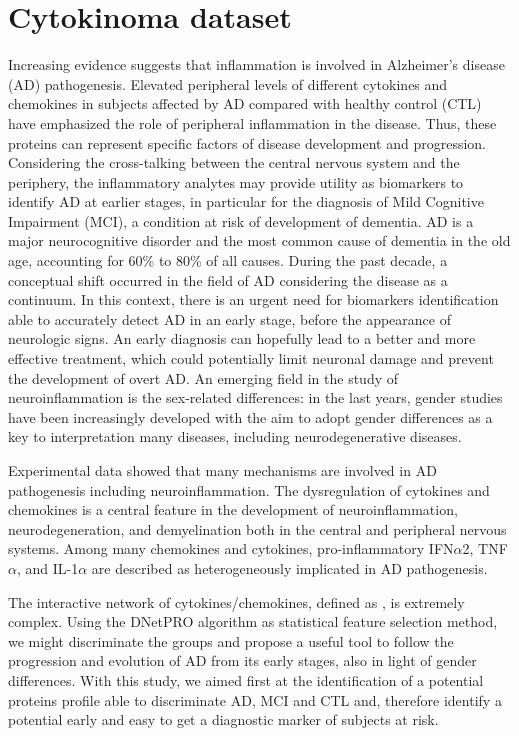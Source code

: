 \documentclass{standalone}
\begin{document}
\section[Cytokinoma Dataset]{Cytokinoma dataset}\label{cytokine}

Increasing evidence suggests that inflammation is involved in Alzheimer's disease (AD) pathogenesis.
Elevated peripheral levels of different cytokines and chemokines in subjects affected by AD compared with healthy control (CTL) have emphasized the role of peripheral inflammation in the disease.
Thus, these proteins can represent specific factors of disease development and progression.
Considering the cross-talking between the central nervous system and the periphery, the inflammatory analytes may provide utility as biomarkers to identify AD at earlier stages, in particular for the diagnosis of Mild Cognitive Impairment (MCI), a condition at risk of development of dementia.
AD is a major neurocognitive disorder and the most common cause of dementia in the old age, accounting for 60\% to 80\% of all causes.
During the past decade, a conceptual shift occurred in the field of AD considering the disease as a continuum.
In this context, there is an urgent need for biomarkers identification able to accurately detect AD in an early stage, before the appearance of neurologic signs.
An early diagnosis can hopefully lead to a better and more effective treatment, which could potentially limit neuronal damage and prevent the development of overt AD.
An emerging field in the study of neuroinflammation is the sex-related differences: in the last years, gender studies have been increasingly developed with the aim to adopt gender differences as a key to interpretation many diseases, including neurodegenerative diseases.

Experimental data showed that many mechanisms are involved in AD pathogenesis including neuroinflammation.
The dysregulation of cytokines and chemokines is a central feature in the development of neuroinflammation, neurodegeneration, and demyelination both in the central and peripheral nervous systems.
Among many chemokines and cytokines, pro-inflammatory IFN$\alpha$2, TNF$\alpha$, and IL-1$\alpha$ are described as heterogeneously implicated in AD pathogenesis.

The interactive network of cytokines/chemokines, defined as , is extremely complex.
Using the DNetPRO algorithm as statistical feature selection method, we might discriminate the groups and propose a useful tool to follow the progression and evolution of AD from its early stages, also in light of gender differences.
With this study, we aimed first at the identification of a potential proteins profile able to discriminate AD, MCI and CTL and, therefore identify a potential early and easy to get a diagnostic marker of subjects at risk.
\end{document}
